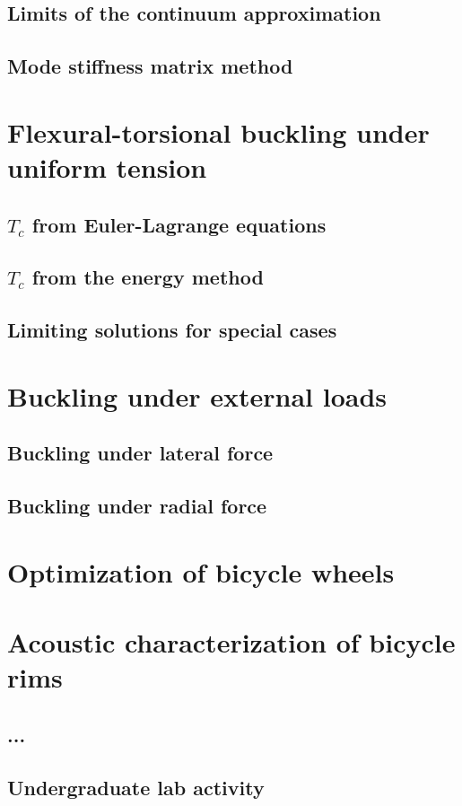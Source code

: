 \documentclass[12pt,letterpaper]{report}
\begin{document}
\section{Limits of the continuum approximation}
\section{Mode stiffness matrix method}


\chapter{Flexural-torsional buckling under uniform tension}
\section{$T_c$ from Euler-Lagrange equations}
\section{$T_c$ from the energy method}
\section{Limiting solutions for special cases}


\chapter{Buckling under external loads}
\section{Buckling under lateral force}
\section{Buckling under radial force}


\chapter{Optimization of bicycle wheels}


\chapter{Acoustic characterization of bicycle rims}
\section{...}
\section{Undergraduate lab activity}
\end{document}
